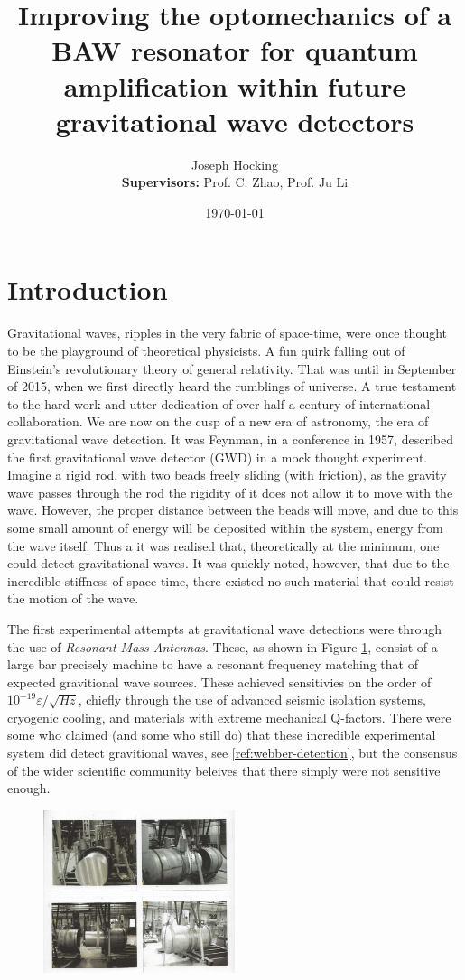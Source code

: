 \documentclass[11pt]{article}
\title{Improving the optomechanics of a BAW resonator for quantum amplification within future gravitational wave detectors}
\author{Joseph Hocking\\\textbf{Supervisors:} Prof. C. Zhao, Prof. Ju Li}
\date{\today}
\begin{document}
\maketitle

\section{Introduction}
    \par
    Gravitational waves, ripples in the very fabric of space-time, were once thought to be the playground of theoretical physicists. A fun quirk falling out of Einstein's revolutionary theory of general relativity. That was until in September of 2015, when we first directly heard the rumblings of universe. A true testament to the hard work and utter dedication of over half a century of international collaboration. We are now on the cusp of a new era of astronomy, the era of gravitational wave detection. It was Feynman, in a conference in 1957, described the first gravitational wave detector (GWD) in a mock thought experiment. Imagine a rigid rod, with two beads freely sliding (with friction), as the gravity wave passes through the rod the rigidity of it does not allow it to move with the wave. However, the proper distance between the beads will move, and due to this some small amount of energy will be deposited within the system, energy from the wave itself. Thus a it was realised that, theoretically at the minimum, one could detect gravitational waves. It was quickly noted, however, that due to the incredible stiffness of space-time, there existed no such material that could resist the motion of the wave.
    \par
    The first experimental attempts at gravitational wave detections were through the use of \textit{Resonant Mass Antennas}. These, as shown in Figure \ref{pic:resonant_bar}, consist of a large bar precisely machine to have a resonant frequency matching that of expected gravitional wave sources. These achieved sensitivies on the order of $10^{-19}\varepsilon/\sqrt{Hz}$, chiefly through the use of advanced seismic isolation systems, cryogenic cooling, and materials with extreme mechanical Q-factors. There were some who claimed (and some who still do) that these incredible experimental system did detect gravitional waves, see \ref{ref:webber-detection}, but the consensus of the wider scientific community beleives that there simply were not sensitive enough.
    \begin{figure}
        \centering
        \includegraphics[width=0.5\textwidth]{img/weber-bar.jpg}
        \label{pic:resonant_bar}
    \end{figure}
\end{document}
